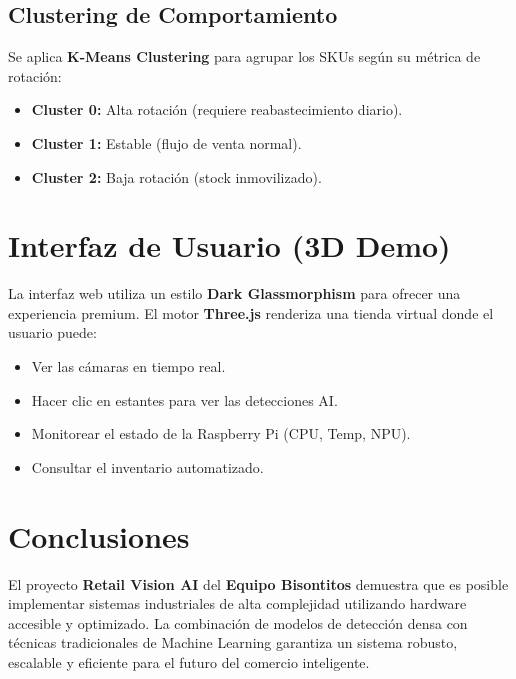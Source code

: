 \documentclass[12pt,a4paper]{article}
\begin{document}
\subsection{Clustering de Comportamiento}
Se aplica \textbf{K-Means Clustering} para agrupar los SKUs según su métrica de rotación:
\begin{itemize}
    \item \textbf{Cluster 0:} Alta rotación (requiere reabastecimiento diario).
    \item \textbf{Cluster 1:} Estable (flujo de venta normal).
    \item \textbf{Cluster 2:} Baja rotación (stock inmovilizado).
\end{itemize}

\section{Interfaz de Usuario (3D Demo)}
La interfaz web utiliza un estilo \textbf{Dark Glassmorphism} para ofrecer una experiencia premium. El motor \textbf{Three.js} renderiza una tienda virtual donde el usuario puede:
\begin{itemize}
    \item Ver las cámaras en tiempo real.
    \item Hacer clic en estantes para ver las detecciones AI.
    \item Monitorear el estado de la Raspberry Pi (CPU, Temp, NPU).
    \item Consultar el inventario automatizado.
\end{itemize}

\section{Conclusiones}
El proyecto \textbf{Retail Vision AI} del \textbf{Equipo Bisontitos} demuestra que es posible implementar sistemas industriales de alta complejidad utilizando hardware accesible y optimizado. La combinación de modelos de detección densa con técnicas tradicionales de Machine Learning garantiza un sistema robusto, escalable y eficiente para el futuro del comercio inteligente.
\end{document}

